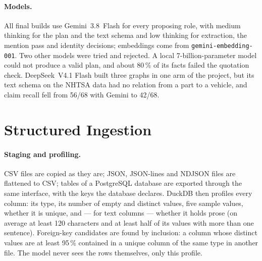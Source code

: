 \paragraph{Models.} All final builds use Gemini~3.8~Flash for every proposing role, with medium thinking for the
plan and the text schema and low thinking for extraction, the mention pass and identity decisions; embeddings
come from \texttt{gemini-embedding-001}. Two other models were tried and rejected. A local 7-billion-parameter
model could not produce a valid plan, and about 80\,\% of its facts failed the quotation check. DeepSeek~V4.1
Flash built three graphs in one arm of the project, but its text schema on the NHTSA data had no relation from a
part to a vehicle, and claim recall fell from 56/68 with Gemini to 42/68.

\section{Structured Ingestion}\label{sec:ch04-structured}

\paragraph{Staging and profiling.} CSV files are copied as they are; JSON, JSON-lines and NDJSON files are
flattened to CSV; tables of a PostgreSQL database are exported through the same interface, with the keys the
database declares. DuckDB then profiles every column: its type, its number of empty and distinct values, five
sample values, whether it is unique, and --- for text columns --- whether it holds prose (on average at least
120 characters and at least half of its values with more than one sentence). Foreign-key candidates are found
by inclusion: a column whose distinct values are at least 95\,\% contained in a unique column of the same type
in another file. The model never sees the rows themselves, only this profile.

